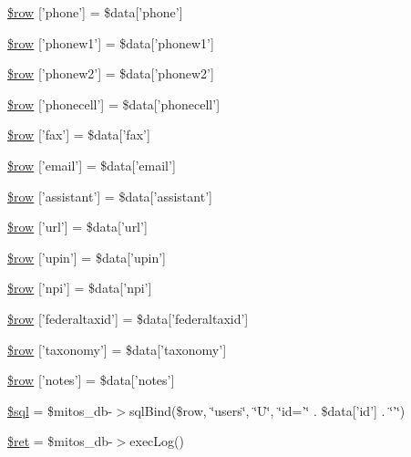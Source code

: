 \begin{DoxyCompactItemize}
\item 
\hyperlink{miscellaneous_2addressbook_2data__update_8ejs_8php_a9eb773d64ffa16faf1e29ccbaf4f065c}{\$row} \mbox{[}'phone'\mbox{]} = \$data\mbox{[}'phone'\mbox{]}
\item 
\hyperlink{miscellaneous_2addressbook_2data__update_8ejs_8php_abd903592f46e704ef4bf1d9b96891334}{\$row} \mbox{[}'phonew1'\mbox{]} = \$data\mbox{[}'phonew1'\mbox{]}
\item 
\hyperlink{miscellaneous_2addressbook_2data__update_8ejs_8php_ac8ae8c92d60ba675fbaeda33916b1ecb}{\$row} \mbox{[}'phonew2'\mbox{]} = \$data\mbox{[}'phonew2'\mbox{]}
\item 
\hyperlink{miscellaneous_2addressbook_2data__update_8ejs_8php_a0517e1ea0f1ef22772f36b37a743d1be}{\$row} \mbox{[}'phonecell'\mbox{]} = \$data\mbox{[}'phonecell'\mbox{]}
\item 
\hyperlink{miscellaneous_2addressbook_2data__update_8ejs_8php_addcf6434ea14720a2fb19d21dc55a8c9}{\$row} \mbox{[}'fax'\mbox{]} = \$data\mbox{[}'fax'\mbox{]}
\item 
\hyperlink{miscellaneous_2addressbook_2data__update_8ejs_8php_a40ee16d8fb0e37c2da5cf0da20f73f1d}{\$row} \mbox{[}'email'\mbox{]} = \$data\mbox{[}'email'\mbox{]}
\item 
\hyperlink{miscellaneous_2addressbook_2data__update_8ejs_8php_ac70ddecf301c4fec9f747b5c7c861243}{\$row} \mbox{[}'assistant'\mbox{]} = \$data\mbox{[}'assistant'\mbox{]}
\item 
\hyperlink{miscellaneous_2addressbook_2data__update_8ejs_8php_adf1010d02c9d45b59dd4435673a49506}{\$row} \mbox{[}'url'\mbox{]} = \$data\mbox{[}'url'\mbox{]}
\item 
\hyperlink{miscellaneous_2addressbook_2data__update_8ejs_8php_aaa10113ab6f803b651bde517d2c22961}{\$row} \mbox{[}'upin'\mbox{]} = \$data\mbox{[}'upin'\mbox{]}
\item 
\hyperlink{miscellaneous_2addressbook_2data__update_8ejs_8php_ae8acb53d6d8e83580307a5aa95fd2304}{\$row} \mbox{[}'npi'\mbox{]} = \$data\mbox{[}'npi'\mbox{]}
\item 
\hyperlink{miscellaneous_2addressbook_2data__update_8ejs_8php_a276b7e7d1682582d07599773e5677ad1}{\$row} \mbox{[}'federaltaxid'\mbox{]} = \$data\mbox{[}'federaltaxid'\mbox{]}
\item 
\hyperlink{miscellaneous_2addressbook_2data__update_8ejs_8php_ac3ee7cf124d7401bbb138317989b316c}{\$row} \mbox{[}'taxonomy'\mbox{]} = \$data\mbox{[}'taxonomy'\mbox{]}
\item 
\hyperlink{miscellaneous_2addressbook_2data__update_8ejs_8php_a6cd140f95df717cfed217fe478482645}{\$row} \mbox{[}'notes'\mbox{]} = \$data\mbox{[}'notes'\mbox{]}
\item 
\hyperlink{miscellaneous_2addressbook_2data__update_8ejs_8php_a047170d6020a882807665812a27e2525}{\$sql} = \$mitos\-\_\-db-\/$>$sql\-Bind(\$row, \char`\"{}users\char`\"{}, \char`\"{}\-U\char`\"{}, \char`\"{}id='\char`\"{} . \$data\mbox{[}'id'\mbox{]} . \char`\"{}'\char`\"{})
\item 
\hyperlink{miscellaneous_2addressbook_2data__update_8ejs_8php_affd9e3eb0aad0a7ca42912cd925f148c}{\$ret} = \$mitos\-\_\-db-\/$>$exec\-Log()
\end{DoxyCompactItemize}


